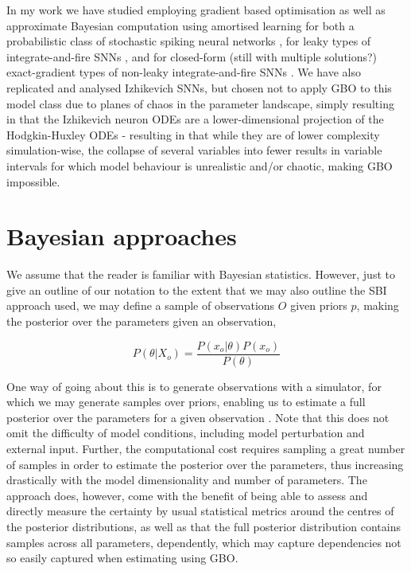 \documentclass[mphil,deptreport,ianc]{infthesis} %
\begin{document}
In my work we have studied employing gradient based optimisation as well as approximate Bayesian computation using amortised learning for both a probabilistic class of stochastic spiking neural networks \cite{Rene2020}, for leaky types of integrate-and-fire SNNs \cite{allen_glif_white_paper}, and for closed-form (still with multiple solutions?) exact-gradient types of non-leaky integrate-and-fire SNNs \cite{Huh2017}.
We have also replicated and analysed Izhikevich SNNs, but chosen not to apply GBO to this model class due to planes of chaos in the parameter landscape, simply resulting in that the Izhikevich neuron ODEs are a lower-dimensional projection of the Hodgkin-Huxley ODEs - resulting in that while they are of lower complexity simulation-wise, the collapse of several variables into fewer results in variable intervals for which model behaviour is unrealistic and/or chaotic, making GBO impossible.


\section{Bayesian approaches}

We assume that the reader is familiar with Bayesian statistics. However, just to give an outline of our notation to the extent that we may also outline the SBI approach used, we may define a sample of observations $O$ given priors $p$, making the posterior over the parameters given an observation,

\begin{equation}
    P(\theta|X_o) = \frac{P(x_o|\theta)P(x_o)}{P(\theta)}
\end{equation}

One way of going about this is to generate observations with a simulator, for which we may generate samples over priors, enabling us to estimate a full posterior over the parameters for a given observation \cite{Lueckmann2017, Lueckmann2018}.
Note that this does not omit the difficulty of model conditions, including model perturbation and external input.
Further, the computational cost requires sampling a great number of samples in order to estimate the posterior over the parameters, thus increasing drastically with the model dimensionality and number of parameters.
The approach does, however, come with the benefit of being able to assess and directly measure the certainty by usual statistical metrics around the centres of the posterior distributions, as well as that the full posterior distribution contains samples across all parameters, dependently, which may capture dependencies not so easily captured when estimating using GBO.
\end{document}
